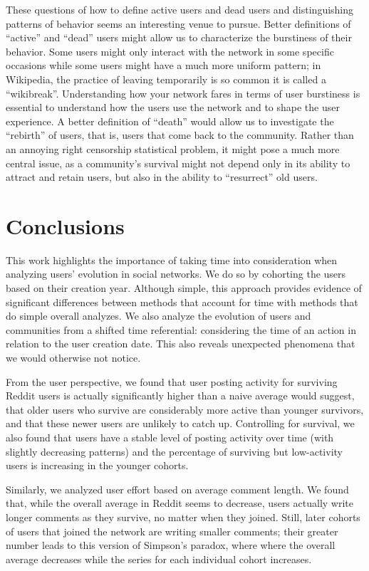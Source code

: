 These questions of how to define active users and dead users and distinguishing patterns of behavior seems an interesting venue to pursue. Better definitions of ``active'' and ``dead'' users might allow us to characterize the burstiness of their behavior.  Some users might only interact with the network in some specific occasions while some users might have a much more uniform pattern; in Wikipedia, the practice of leaving temporarily is so common it is called a ``wikibreak''. Understanding how your network fares in terms of user burstiness is essential to understand how the users use the network and to shape the user experience.  A better definition of ``death'' would allow us to investigate the ``rebirth'' of users, that is, users that come back to the community.  Rather than an annoying right censorship statistical problem, it might pose a much more central issue, as a community's survival might not depend only in its ability to attract and retain users, but also in the ability to ``resurrect'' old users. 

\section{Conclusions}

This work highlights the importance of taking time into consideration when analyzing users' evolution in social networks. We do so by cohorting the users based on their creation year. Although simple, this approach provides evidence of significant differences between methods that account for time with methods that do simple overall analyzes.  We also analyze the evolution of users and communities from a shifted time referential: considering the time of an action in relation to the user creation date. This also reveals unexpected phenomena that we would otherwise not notice.

From the user perspective, we found that user posting activity for surviving Reddit users is actually significantly higher than a naive average would suggest, that older users who survive are considerably more active than younger survivors, and that these newer users are unlikely to catch up.   Controlling for survival, we also found that users have a stable level of posting activity over time (with slightly decreasing patterns) and the percentage of surviving but low-activity users is increasing in the younger cohorts.  

Similarly, we analyzed user effort based on average comment length. We found that, while the overall average in Reddit seems to decrease, users actually write longer comments as they survive, no matter when they joined.  Still, later cohorts of users that joined the network are writing smaller comments; their greater number leads to this version of Simpson's paradox, where where the overall average decreases while the series for each individual cohort increases. 

